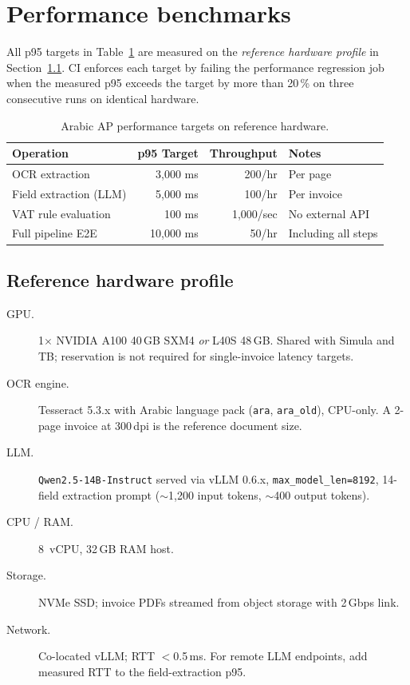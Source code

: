 \section{Performance benchmarks}

All p95 targets in Table~\ref{tab:ap-perf-targets} are measured on the
\emph{reference hardware profile} in Section~\ref{sec:ap-perf-hardware}.
CI enforces each target by failing the performance regression job when
the measured p95 exceeds the target by more than 20\,\% on three
consecutive runs on identical hardware.

\begin{table}[htbp]
\centering
\caption{Arabic AP performance targets on reference hardware.}
\label{tab:ap-perf-targets}
\footnotesize
\begin{tabularx}{\linewidth}{@{}l r r X@{}}
\toprule
\textbf{Operation} & \textbf{p95 Target} & \textbf{Throughput} & \textbf{Notes} \\ \midrule
OCR extraction & 3,000 ms & 200/hr & Per page \\
Field extraction (LLM) & 5,000 ms & 100/hr & Per invoice \\
VAT rule evaluation & 100 ms & 1,000/sec & No external API \\
Full pipeline E2E & 10,000 ms & 50/hr & Including all steps \\
\bottomrule
\end{tabularx}
\end{table}

\subsection{Reference hardware profile}
\label{sec:ap-perf-hardware}

\begin{description}
  \item[GPU.] 1$\times$ NVIDIA A100 40\,GB SXM4 \emph{or} L40S 48\,GB.
        Shared with Simula and TB; reservation is not required for
        single-invoice latency targets.
  \item[OCR engine.] Tesseract 5.3.x with Arabic language pack
        (\texttt{ara}, \texttt{ara\_old}), CPU-only. A 2-page invoice
        at 300\,dpi is the reference document size.
  \item[LLM.] \texttt{Qwen2.5-14B-Instruct} served via vLLM 0.6.x,
        \texttt{max\_model\_len=8192}, 14-field extraction prompt
        ($\sim$1,200 input tokens, $\sim$400 output tokens).
  \item[CPU / RAM.] 8~vCPU, 32\,GB RAM host.
  \item[Storage.] NVMe SSD; invoice PDFs streamed from object storage
        with 2\,Gbps link.
  \item[Network.] Co-located vLLM; RTT $<$0.5\,ms. For remote LLM
        endpoints, add measured RTT to the field-extraction p95.
\end{description}

